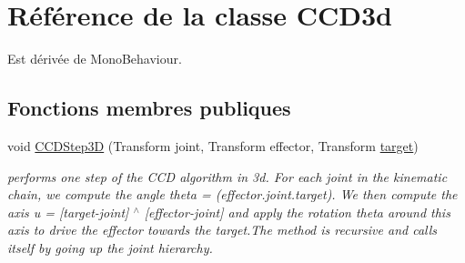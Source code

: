 \hypertarget{class_c_c_d3d}{\section{Référence de la classe C\+C\+D3d}
\label{class_c_c_d3d}
}


Est dérivée de Mono\+Behaviour.

\subsection*{Fonctions membres publiques}
\begin{DoxyCompactItemize}
\item 
void \hyperlink{class_c_c_d3d_a683157309588f0981bd0c6387260f9ca}{C\+C\+D\+Step3\+D} (Transform joint, Transform effector, Transform \hyperlink{class_c_c_d3d_a8a24b37582e07ee23646b165d54fa600}{target})
\begin{DoxyCompactList}\small\item\em performs one step of the C\+C\+D algorithm in 3d. For each joint in the kinematic chain, we compute the angle theta = (effector.\+joint.\+target). We then compute the axis u = \mbox{[}target-\/joint\mbox{]} $^\wedge$ \mbox{[}effector-\/joint\mbox{]} and apply the rotation theta around this axis to drive the effector towards the target.\+The method is recursive and calls itself by going up the joint hierarchy. \end{DoxyCompactList}\end{DoxyCompactItemize}
